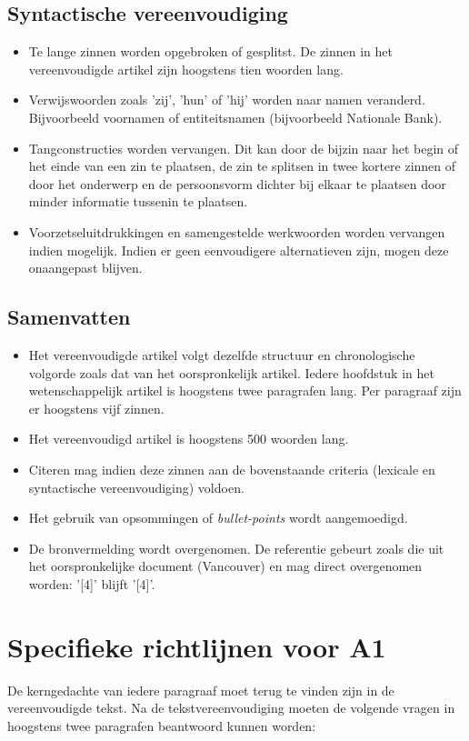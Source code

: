 	\subsection{Syntactische vereenvoudiging}
	
	\begin{itemize}
		\item Te lange zinnen worden opgebroken of gesplitst. De zinnen in het vereenvoudigde artikel zijn hoogstens tien woorden lang.
		\item Verwijswoorden zoals 'zij', 'hun' of 'hij' worden naar namen veranderd. Bijvoorbeeld voornamen of entiteitsnamen (bijvoorbeeld Nationale Bank). 
		\item Tangconstructies worden vervangen. Dit kan door de bijzin naar het begin of het einde van een zin te plaatsen, de zin te splitsen in twee kortere zinnen of door het onderwerp en de persoonsvorm dichter bij elkaar te plaatsen door minder informatie tussenin te plaatsen.
		\item Voorzetseluitdrukkingen en samengestelde werkwoorden worden vervangen indien mogelijk. Indien er geen eenvoudigere alternatieven zijn, mogen deze onaangepast blijven.
	\end{itemize}
	
	\subsection{Samenvatten}
	
	\begin{itemize}
		\item Het vereenvoudigde artikel volgt dezelfde structuur en chronologische volgorde zoals dat van het oorspronkelijk artikel. Iedere hoofdstuk in het wetenschappelijk artikel is hoogstens twee paragrafen lang. Per paragraaf zijn er hoogstens vijf zinnen.
		\item Het vereenvoudigd artikel is hoogstens 500 woorden lang. 
		\item Citeren mag indien deze zinnen aan de bovenstaande criteria (lexicale en syntactische vereenvoudiging) voldoen.
		\item Het gebruik van opsommingen of \textit{bullet-points} wordt aangemoedigd.
		\item De bronvermelding wordt overgenomen. De referentie gebeurt zoals die uit het oorspronkelijke document (Vancouver) en mag direct overgenomen worden: '[4]' blijft '[4]'.
	\end{itemize}
	
	
	\section{Specifieke richtlijnen voor A1}
De kerngedachte van iedere paragraaf moet terug te vinden zijn in de vereenvoudigde tekst. Na de tekstvereenvoudiging moeten de volgende vragen in hoogstens twee paragrafen beantwoord kunnen worden:
	

